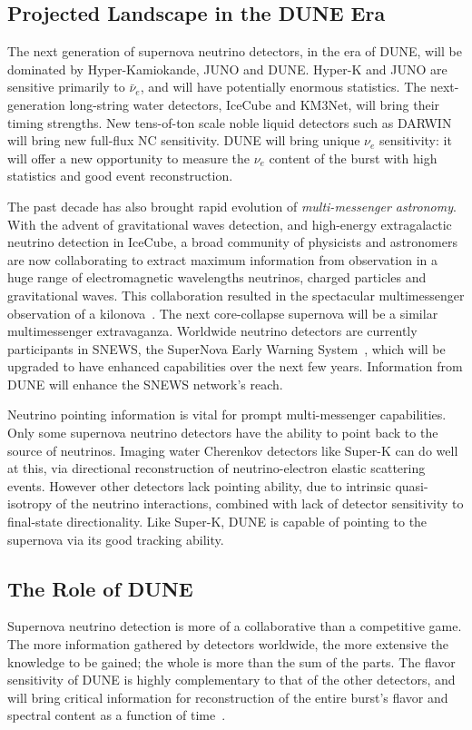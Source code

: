 \subsection{Projected Landscape in the DUNE Era}
The next generation of supernova neutrino detectors, in the era of
DUNE, will be dominated by Hyper-Kamiokande, JUNO and DUNE.  Hyper-K
and JUNO are sensitive primarily to $\bar{\nu}_e$, and will have
potentially enormous statistics.  The next-generation long-string
water detectors, IceCube and KM3Net, will bring their timing
strengths.   New tens-of-ton scale
noble liquid detectors such as DARWIN will bring new full-flux NC
sensitivity. 
DUNE will bring unique $\nu_e$ sensitivity: it will offer
a new opportunity to measure the $\nu_e$ content of the burst with
high statistics and good event reconstruction.

The past decade has also brought rapid evolution of
\textit{multi-messenger astronomy}.  With the advent of gravitational
waves detection, and high-energy extragalactic neutrino detection in
IceCube, a broad community of physicists and astronomers are now
collaborating to extract maximum information from observation in a
huge range of electromagnetic wavelengths neutrinos, charged particles
and gravitational waves.  This collaboration resulted in the
spectacular multimessenger observation of a kilonova~\cite{kilonova}.  The
next core-collapse supernova will be a similar multimessenger
extravaganza.  Worldwide neutrino detectors are currently participants
in SNEWS, the SuperNova Early Warning System~\cite{snews}, which will be
upgraded to have enhanced capabilities over the next few
years.  Information from DUNE will enhance the SNEWS
network's reach.

Neutrino pointing information is vital for prompt multi-messenger
capabilities.  Only some supernova neutrino detectors have the ability
to point back to the source of neutrinos.  Imaging water Cherenkov
detectors like Super-K can do well at this, via directional
reconstruction of neutrino-electron elastic scattering events. However other detectors
lack pointing ability, due to intrinsic quasi-isotropy of the neutrino
interactions, combined with lack of detector sensitivity to
final-state directionality.  Like Super-K, DUNE is capable of pointing
to the supernova via its good tracking ability.

\subsection{The Role of DUNE}
Supernova neutrino detection is more of a collaborative than a
competitive game.  The more information gathered by detectors
worldwide, the more extensive the knowledge to be gained; the whole is
more than the sum of the parts.  The flavor sensitivity of DUNE is
highly complementary to that of the other detectors, and will bring
critical information for reconstruction of the entire burst's flavor and
spectral content as a function of time~\cite{Ankowski:2016lab}.

